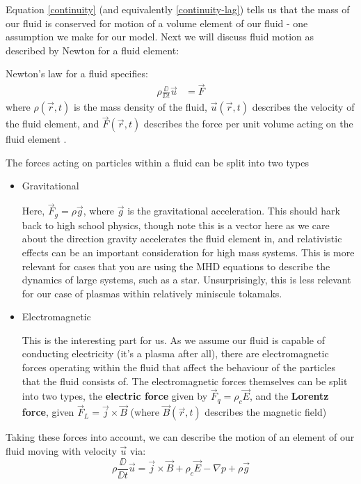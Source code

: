 Equation \eqref{continuity} (and equivalently \eqref{continuity-lag}) tells us that the mass of our fluid is conserved for motion of a volume element 
of our fluid - one assumption we make for our model. Next we will discuss fluid motion as described by Newton for a fluid element:

\begin{definition}
    Newton's law for a fluid specifies:
    \begin{align}
        \rho \frac{\DD }{\DD t} \vec{u} &= \vec{F}
    \end{align}
    where $\rho(\vec{r}, t)$ is the mass density of the fluid, 
    $\vec{u}(\vec{r}, t)$ describes the velocity of the fluid element, and $\vec{F}(\vec{r}, t)$ 
    describes the force per unit volume acting on the fluid element \cite{mhd-lectures}.
\end{definition}
The forces acting on particles within a fluid can be split into two types
\begin{itemize}
    \item Gravitational
    
    Here, $\vec{F}_g = \rho \vec{g}$, where $\vec{g}$ is the gravitational acceleration. This should hark back to high school 
    physics, though note this is a vector here as we care about the direction gravity accelerates the fluid element in, 
    and relativistic effects can be an important consideration for high mass systems. This is more relevant for cases that 
    you are using the MHD equations to describe the dynamics of large systems, such as a star. Unsurprisingly, this is less relevant 
    for our case of plasmas within relatively miniscule tokamaks.

    \item Electromagnetic
    
    This is the interesting part for us. As we assume our fluid is capable of conducting electricity (it's a plasma after all),
    there are electromagnetic forces operating within the fluid that affect the behaviour of the particles that the fluid consists of. 
    The electromagnetic forces themselves can be split into two types, the \textbf{electric force} given by $\vec{F}_q = \rho_c \vec{E}$, 
    and the \textbf{Lorentz force}, given $\vec{F}_{L} = \vec{j} \times \vec{B}$ (where $\vec{B}(\vec{r}, t)$ describes the magnetic field)
\end{itemize}
Taking these forces into account, we can describe the motion of an element of our fluid moving with velocity $\vec{u}$ 
via:
\begin{equation}
    \rho \frac{\DD}{\DD t} \vec{u} =  \vec{j} \times \vec{B} + \rho_c \vec{E} - \nabla p + \rho \vec{g}
\end{equation}


